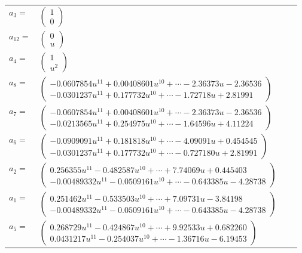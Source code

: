 \documentclass[1p]{elsarticle_modified}
\theoremstyle{definition}
\begin{document}
\begin{tabular}{m{7pt} m{180pt} m{7pt} m{180pt} }
\flushright $a_{3}=$&$\begin{pmatrix}1\\0\end{pmatrix}$ \\
\flushright $a_{12}=$&$\begin{pmatrix}0\\u\end{pmatrix}$ \\
\flushright $a_{4}=$&$\begin{pmatrix}1\\u^2\end{pmatrix}$ \\
\flushright $a_{8}=$&$\begin{pmatrix}-0.0607854 u^{11}+0.00408601 u^{10}+\cdots-2.36373 u-2.36536\\-0.0301237 u^{11}+0.177732 u^{10}+\cdots-1.72718 u+2.81991\end{pmatrix}$ \\
\flushright $a_{7}=$&$\begin{pmatrix}-0.0607854 u^{11}+0.00408601 u^{10}+\cdots-2.36373 u-2.36536\\-0.0213565 u^{11}+0.254975 u^{10}+\cdots-1.64596 u+4.11224\end{pmatrix}$ \\
\flushright $a_{6}=$&$\begin{pmatrix}-0.0909091 u^{11}+0.181818 u^{10}+\cdots-4.09091 u+0.454545\\-0.0301237 u^{11}+0.177732 u^{10}+\cdots-0.727180 u+2.81991\end{pmatrix}$ \\
\flushright $a_{2}=$&$\begin{pmatrix}0.256355 u^{11}-0.482587 u^{10}+\cdots+7.74069 u+0.445403\\-0.00489332 u^{11}-0.0509161 u^{10}+\cdots-0.643385 u-4.28738\end{pmatrix}$ \\
\flushright $a_{1}=$&$\begin{pmatrix}0.251462 u^{11}-0.533503 u^{10}+\cdots+7.09731 u-3.84198\\-0.00489332 u^{11}-0.0509161 u^{10}+\cdots-0.643385 u-4.28738\end{pmatrix}$ \\
\flushright $a_{5}=$&$\begin{pmatrix}0.268729 u^{11}-0.424867 u^{10}+\cdots+9.92533 u+0.682260\\0.0431217 u^{11}-0.254037 u^{10}+\cdots-1.36716 u-6.19453\end{pmatrix}$ \\

\end{tabular}
\end{document}

